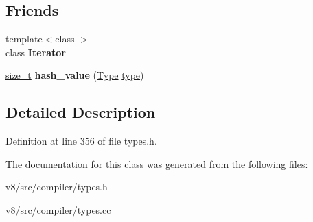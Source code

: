 \subsection*{Friends}
\begin{DoxyCompactItemize}
\item 
\mbox{\label{classv8_1_1internal_1_1compiler_1_1Type_ade6ce99c1c6680cd228fe1aa6927bdaf}} 
{\footnotesize template$<$class $>$ }\\class {\bfseries Iterator}
\item 
\mbox{\label{classv8_1_1internal_1_1compiler_1_1Type_abb25e246ed09d3629f51e33c0429b0b5}} 
\mbox{\hyperlink{classsize__t}{size\+\_\+t}} {\bfseries hash\+\_\+value} (\mbox{\hyperlink{classv8_1_1internal_1_1compiler_1_1Type}{Type}} \mbox{\hyperlink{classstd_1_1conditional_1_1type}{type}})
\end{DoxyCompactItemize}


\subsection{Detailed Description}


Definition at line 356 of file types.\+h.



The documentation for this class was generated from the following files\+:\begin{DoxyCompactItemize}
\item 
v8/src/compiler/types.\+h\item 
v8/src/compiler/types.\+cc\end{DoxyCompactItemize}
